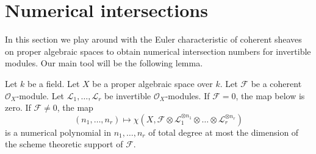 \section{Numerical intersections}
\label{section-num}

\noindent
In this section we play around with the Euler characteristic of
coherent sheaves on proper algebraic spaces to obtain numerical intersection
numbers for invertible modules. Our main tool will be the following
lemma.

\begin{lemma}
\label{lemma-numerical-polynomial-from-euler}
Let $k$ be a field. Let $X$ be a proper algebraic space over $k$.
Let $\mathcal{F}$ be a coherent $\mathcal{O}_X$-module. Let
$\mathcal{L}_1, \ldots, \mathcal{L}_r$ be invertible $\mathcal{O}_X$-modules.
If $\mathcal{F} = 0$, the map below is zero. If $\mathcal{F} \not = 0$, the map
$$
(n_1, \ldots, n_r) \longmapsto
\chi(X, \mathcal{F} \otimes
\mathcal{L}_1^{\otimes n_1} \otimes \ldots \otimes
\mathcal{L}_r^{\otimes n_r})
$$
is a numerical polynomial in $n_1, \ldots, n_r$ of total degree at
most the dimension of the scheme theoretic support of $\mathcal{F}$.
\end{lemma}


